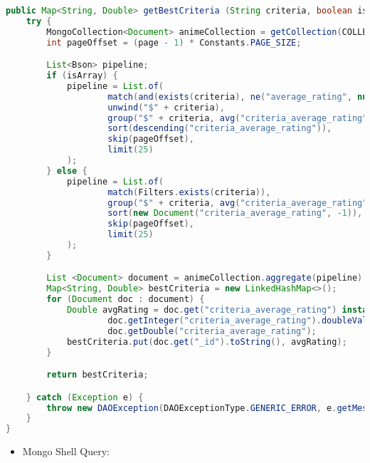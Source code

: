 \begin{mdframed}[style=customstyle]
\begin{lstlisting}[language=java]
public Map<String, Double> getBestCriteria (String criteria, boolean isArray, int page) throws DAOException {
    try {
        MongoCollection<Document> animeCollection = getCollection(COLLECTION_NAME);
        int pageOffset = (page - 1) * Constants.PAGE_SIZE;

        List<Bson> pipeline;
        if (isArray) {
            pipeline = List.of(
                    match(and(exists(criteria), ne("average_rating", null))),
                    unwind("$" + criteria),
                    group("$" + criteria, avg("criteria_average_rating", "$average_rating")),
                    sort(descending("criteria_average_rating")),
                    skip(pageOffset),
                    limit(25)
            );
        } else {
            pipeline = List.of(
                    match(Filters.exists(criteria)),
                    group("$" + criteria, avg("criteria_average_rating", "$average_rating")),
                    sort(new Document("criteria_average_rating", -1)),
                    skip(pageOffset),
                    limit(25)
            );
        }

        List <Document> document = animeCollection.aggregate(pipeline).into(new ArrayList<>());
        Map<String, Double> bestCriteria = new LinkedHashMap<>();
        for (Document doc : document) {
            Double avgRating = doc.get("criteria_average_rating") instanceof Integer?
                    doc.getInteger("criteria_average_rating").doubleValue() :
                    doc.getDouble("criteria_average_rating");
            bestCriteria.put(doc.get("_id").toString(), avgRating);
        }

        return bestCriteria;

    } catch (Exception e) {
        throw new DAOException(DAOExceptionType.GENERIC_ERROR, e.getMessage());
    }
}\end{lstlisting}
\end{mdframed}

\newpage

\begin{itemize}
    \item Mongo Shell Query:
\end{itemize}

